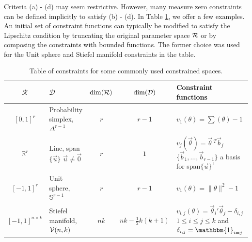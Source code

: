\documentclass[10pt,fleqn]{article}
\newcommand{\aki}[1]{{\color{green}{#1}}}
\DeclareMathOperator{\1}{\mathbbm{1}} \DeclareMathOperator{\bigO}{\mc O}
\begin{document}
Criteria (a) - (d) may seem restrictive. However, many measure zero constraints can be defined implicitly to satisfy (b) - (d).  In Table \ref{TABLE:Equality_constraints_examples}, we offer a few examples. %
An initial set of constraint functions can typically be modified to satisfy the Lipschitz condition by truncating the 
original parameter space $\mathcal{R}$ or by composing the constraints with bounded functions. The former  choice was used for the Unit sphere and Stiefel manifold constraints in the table.
 \renewcommand{\arraystretch}{1.5} \begin{table}[h!]
\begin{center} \begin{tabular}{| c | m{4 cm} | c | c | m{6cm} |}
\hline $\mathcal{R}$                           &
$\mathcal{D}$                                  &
$\dim(\mathcal{R})$                                  &
$\dim( \mathcal{D})$                                 & Constraint functions                                  \\ \hline $[0,1]^r$ &
Probability simplex, $\Delta^{r-1}$            & $r$                            & $r-1$ & $v_1(\theta)
= \sum(\theta) -1$                                                                                     \\ \hline $\mathbb{R}^r$ & Line,
span$\{\vec{u}\}$ \newline $\vec{u}\ne\vec{0}$ & $r$                            & $1$
&
$v_j(\vec{\theta}) = \vec{\theta}\,^T\vec{b}_j$ \newline
$\{\vec{b}_1,\dots,\vec{b}_{r-1}\}$ a basis for
span$\{\vec{u}\}^\perp$                                                                                \\ \hline $[-1,1]^r$ & Unit
sphere, $\mathbb{S}^{r-1}$                     & $r$                            & $r-1$ & $v_1(\theta) =
\|\theta\|^2 -1$                                                                                     \\ \hline $[-1,1]^{n\times
k}$                                            & Stiefel manifold, $\mathcal{V}(n,k)$ & $nk$  & $nk -
\frac{1}{2}k(k+1)$                             & $v_{i,j}(\theta) = 
\vec{\theta}_i'\vec{\theta}_j- \delta_{i,j}$ \newline
$1\le i \le j \le k$ and $\delta_{i,j} = \mathbbm{1}_{i=j}$
\\ \hline\end{tabular} \end{center} \caption{Table of
constraints for some commonly used constrained spaces.}
\label{TABLE:Equality_constraints_examples} \end{table}
\end{document}
